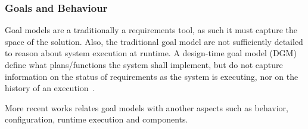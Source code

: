 \subsubsection{Goals and Behaviour}

Goal models are a traditionally a requirements tool, as such it must capture the space of the solution. Also, the traditional goal model are not sufficiently detailed to reason about system execution at runtime. A design-time goal model (DGM) define what plans/functions the system shall implement, but do not capture information on the status of requirements as the system is executing, nor on the history of an execution~\cite{borgida_requirements_2013}.

 More recent works relates goal models with another aspects such as behavior, configuration, runtime execution and components.
